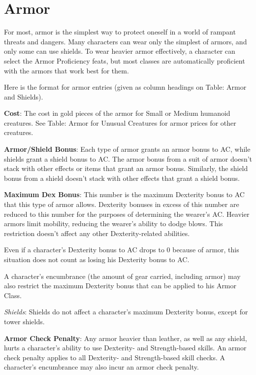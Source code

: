 \section{Armor}

	
For most, armor is the simplest way to protect oneself in a world of rampant threats and dangers. Many characters can wear only the simplest of armors, and only some can use shields. To wear heavier armor effectively, a character can select the Armor Proficiency feats, but most classes are automatically proficient with the armors that work best for them.
	
Here is the format for armor entries (given as column headings on Table: Armor and Shields).
	
\textbf{Cost}: The cost in gold pieces of the armor for Small or Medium humanoid creatures. See Table: Armor for Unusual Creatures for armor prices for other creatures.
	
\textbf{Armor/Shield Bonus}: Each type of armor grants an armor bonus to AC, while shields grant a shield bonus to AC. The armor bonus from a suit of armor doesn't stack with other effects or items that grant an armor bonus. Similarly, the shield bonus from a shield doesn't stack with other effects that grant a shield bonus.
	
\textbf{Maximum Dex Bonus}: This number is the maximum Dexterity bonus to AC that this type of armor allows. Dexterity bonuses in excess of this number are reduced to this number for the purposes of determining the wearer's AC. Heavier armors limit mobility, reducing the wearer's ability to dodge blows. This restriction doesn't affect any other Dexterity-related abilities.
	
Even if a character's Dexterity bonus to AC drops to 0 because of armor, this situation does not count as losing his Dexterity bonus to AC. 
	
A character's encumbrance (the amount of gear carried, including armor) may also restrict the maximum Dexterity bonus that can be applied to his Armor Class.
	
\textit{Shields}: Shields do not affect a character's maximum Dexterity bonus, except for tower shields.
	
\textbf{Armor Check Penalty}: Any armor heavier than leather, as well as any shield, hurts a character's ability to use Dexterity- and Strength-based skills. An armor check penalty applies to all Dexterity- and Strength-based skill checks. A character's encumbrance may also incur an armor check penalty.
	
